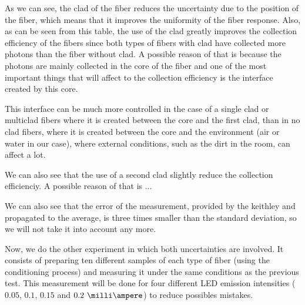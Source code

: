 As we can see, the clad of the fiber reduces the uncertainty due to the position of the fiber, which means that it improves the uniformity of the fiber response. Also, as can be seen from this table, the use of the clad greatly improves the collection efficiency of the fibers since both types of fibers with clad have collected more photons than the fiber without clad. A possible reason of that is because the photons are mainly collected in the core of the fiber and one of the most important things that will affect to the collection efficiency is the interface created by this core. 

This interface can be much more controlled in the case of a single clad or multiclad fibers where it is created between the core and the first clad, than in no clad fibers, where it is created between the core and the environment (air or water in our case), where external conditions, such as the dirt in the room, can affect a lot.

We can also see that the use of a second clad slightly reduce the collection efficienciy. A possible reason of that is ...



We can also see that the error of the measurement, provided by the keithley and propagated to the average, is three times smaller than the standard deviation, so we will not take it into account any more.


Now, we do the other experiment in which both uncertainties are involved. It consists of preparing ten different samples of each type of fiber (using the conditioning process) and measuring it under the same conditions as the previous test. This measurement will be done for four different LED emission intensities ($0.05$, $0.1$, $0.15$ and $0.2~\milli\ampere$) to reduce possibles mistakes.

